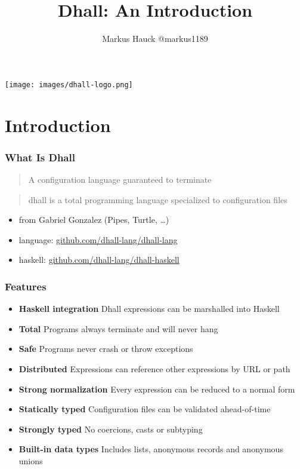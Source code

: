 \documentclass{beamer}
\title{Dhall: An Introduction}
\author{Markus Hauck @markus1189}
\begin{document}
\begin{frame}
  \begin{center}
    \texttt{[image: images/dhall-logo.png]}
  \end{center}
  \titlepage{}
\end{frame}

\section{Introduction}\label{sec:introduction}

\begin{frame}
  \frametitle{What Is Dhall}
  \begin{quote}
    A configuration language guaranteed to terminate
  \end{quote}
  \begin{quote}
    dhall is a total programming language specialized to configuration files
  \end{quote}
  \begin{itemize}
  \item from Gabriel Gonzalez (Pipes, Turtle, \ldots{})
  \item language: \url{github.com/dhall-lang/dhall-lang}
  \item haskell: \url{github.com/dhall-lang/dhall-haskell}
  \end{itemize}
 \end{frame}

 \begin{frame}
   \frametitle{Features}
   \begin{itemize}
   \item \textbf{Haskell integration} \textemdash{} Dhall expressions can be
     marshalled into Haskell
   \item \textbf{Total} \textemdash{} Programs always terminate and will never
     hang
   \item \textbf{Safe} \textemdash{} Programs never crash or throw exceptions
   \item \textbf{Distributed} \textemdash{} Expressions can reference other
     expressions by URL or path
   \item \textbf{Strong normalization} \textemdash{} Every expression can be
     reduced to a normal form
   \item \textbf{Statically typed} \textemdash{} Configuration files can be
     validated ahead-of-time
   \item \textbf{Strongly typed} \textemdash{} No coercions, casts or subtyping
   \item \textbf{Built-in data types} \textemdash{} Includes lists, anonymous
     records and anonymous unions
   \end{itemize}
 \end{frame}
\end{document}

